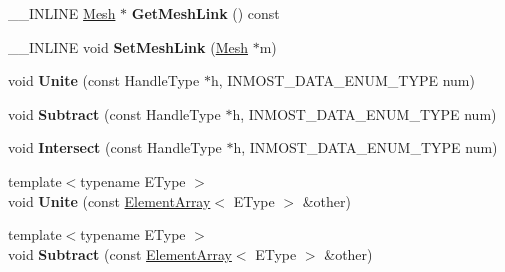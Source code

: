 \begin{DoxyCompactItemize}
\item 
\hypertarget{classINMOST_1_1ElementArray_aa4f9500280642abdc2723ba1bd6fe28e}{\-\_\-\-\_\-\-I\-N\-L\-I\-N\-E \hyperlink{classINMOST_1_1Mesh}{Mesh} $\ast$ {\bfseries Get\-Mesh\-Link} () const }\label{classINMOST_1_1ElementArray_aa4f9500280642abdc2723ba1bd6fe28e}

\item 
\hypertarget{classINMOST_1_1ElementArray_a7df549c739b4ebe4d7a217b8a8cf7ee2}{\-\_\-\-\_\-\-I\-N\-L\-I\-N\-E void {\bfseries Set\-Mesh\-Link} (\hyperlink{classINMOST_1_1Mesh}{Mesh} $\ast$m)}\label{classINMOST_1_1ElementArray_a7df549c739b4ebe4d7a217b8a8cf7ee2}

\item 
\hypertarget{classINMOST_1_1ElementArray_a40631e81810b2e68170e9b097d07d4ee}{void {\bfseries Unite} (const Handle\-Type $\ast$h, I\-N\-M\-O\-S\-T\-\_\-\-D\-A\-T\-A\-\_\-\-E\-N\-U\-M\-\_\-\-T\-Y\-P\-E num)}\label{classINMOST_1_1ElementArray_a40631e81810b2e68170e9b097d07d4ee}

\item 
\hypertarget{classINMOST_1_1ElementArray_a30570473c37a26dd74035437f86901a6}{void {\bfseries Subtract} (const Handle\-Type $\ast$h, I\-N\-M\-O\-S\-T\-\_\-\-D\-A\-T\-A\-\_\-\-E\-N\-U\-M\-\_\-\-T\-Y\-P\-E num)}\label{classINMOST_1_1ElementArray_a30570473c37a26dd74035437f86901a6}

\item 
\hypertarget{classINMOST_1_1ElementArray_a98aeb06a05da18e3551de5f5f43499a1}{void {\bfseries Intersect} (const Handle\-Type $\ast$h, I\-N\-M\-O\-S\-T\-\_\-\-D\-A\-T\-A\-\_\-\-E\-N\-U\-M\-\_\-\-T\-Y\-P\-E num)}\label{classINMOST_1_1ElementArray_a98aeb06a05da18e3551de5f5f43499a1}

\item 
\hypertarget{classINMOST_1_1ElementArray_a271d7b4bff4a170cae01aa440351a565}{{\footnotesize template$<$typename E\-Type $>$ }\\void {\bfseries Unite} (const \hyperlink{classINMOST_1_1ElementArray}{Element\-Array}$<$ E\-Type $>$ \&other)}\label{classINMOST_1_1ElementArray_a271d7b4bff4a170cae01aa440351a565}

\item 
\hypertarget{classINMOST_1_1ElementArray_aa714a1586fa8c427240190940cc77d5a}{{\footnotesize template$<$typename E\-Type $>$ }\\void {\bfseries Subtract} (const \hyperlink{classINMOST_1_1ElementArray}{Element\-Array}$<$ E\-Type $>$ \&other)}\label{classINMOST_1_1ElementArray_aa714a1586fa8c427240190940cc77d5a}


\end{DoxyCompactItemize}
